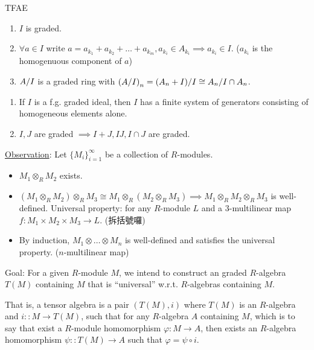 \begin{exercise}
  TFAE
  \begin{enumerate}[(1)]
    \item $I$ is graded.
    \item $\forall a \in I$ write $a = a_{k_1} + a_{k_2} + \dots + a_{k_m},
      a_{k_i} \in A_{k_i} \implies a_{k_i} \in I$.
      ($a_{k_i}$ is the homogenuous component of $a$)
    \item ${A}/{I}$ is a graded ring with
      $\left({A}/{I}\right)_n = {(A_n + I)}/{I}
      \cong {A_n}/{I \cap A_n}$.
  \end{enumerate}
\end{exercise}

\begin{exercise} \mbox{}
  \begin{enumerate}[(1)]
    \item If $I$ is a f.g. graded ideal, then $I$ has a finite system of
      generators consisting of homogeneous elements alone.
    \item $I, J$ are graded $\implies I+J, IJ, I \cap J$ are graded.
  \end{enumerate}
\end{exercise}

\underline{Observation}:
Let $\{ M_i \}_{i=1}^\infty$ be a collection of $R$-modules.
\begin{itemize}
  \item $M_1 \otimes_R M_2$ exists.
  \item $(M_1 \otimes_R M_2) \otimes_R M_3 \cong
    M_1 \otimes_R (M_2 \otimes_R M_3) \implies
    M_1 \otimes_R M_2 \otimes_R M_3$ is well-defined.
    Universal property: for any $R$-module $L$ and a $3$-multilinear map
    $f: M_1 \times M_2 \times M_3 \to L$. (拆括號囉)
  \item By induction, $M_1 \otimes \dots \otimes M_n$ is well-defined and
    satisfies the universal property. ($n$-multilinear map)
\end{itemize}

Goal: For a given $R$-module $M$, we intend to construct an graded $R$-algebra
$T(M)$ containing $M$ that is ``universal'' w.r.t. $R$-algebras containing $M$.

That is, a tensor algebra is a pair $(T(M), i)$ where $T(M)$ is an $R$-algebra
and $i :: M \to T(M)$, such that for any $R$-algebra $A$ containing $M$,
which is to say that exist a $R$-module homomorphism $\varphi: M \to A$,
then exists an $R$-algebra homomorphism $\psi :: T(M) \to A$ such
that $\varphi = \psi \circ i$. \\[.5em]

